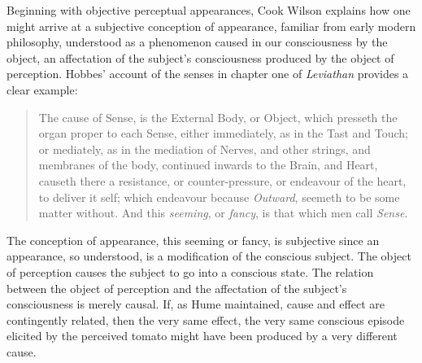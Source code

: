 \documentclass[12pt]{article}
\begin{document}
Beginning with objective perceptual appearances, Cook Wilson explains how one might arrive at a subjective conception of appearance, familiar from early modern philosophy, understood as a phenomenon caused in our consciousness by the object, an affectation of the subject's consciousness produced by the object of perception. Hobbes' account of the senses in chapter one of \emph{Leviathan} provides a clear example:
\begin{quote}
    The cause of Sense, is the External Body, or Object, which presseth the organ proper to each Sense, either immediately, as in the Tast and Touch; or mediately, as in the mediation of Nerves, and other strings, and membranes of the body, continued inwards to the Brain, and Heart, causeth there a resistance, or counter-pressure, or endeavour of the heart, to deliver it self; which endeavour because \emph{Outward}, seemeth to be some matter without. And this \emph{seeming}, or \emph{fancy}, is that which men call \emph{Sense}. \citep[\emph{Leviathan},][\textsc{i}.1]{Hobbes:1651fk}
\end{quote}
The conception of appearance, this seeming or fancy, is subjective since an appearance, so understood, is a modification of the conscious subject. The object of perception causes the subject to go into a conscious state. The relation between the object of perception and the affectation of the subject's consciousness is merely causal. If, as Hume maintained, cause and effect are contingently related, then the very same effect, the very same conscious episode elicited by the perceived tomato might have been produced by a very different cause. 
\end{document}
